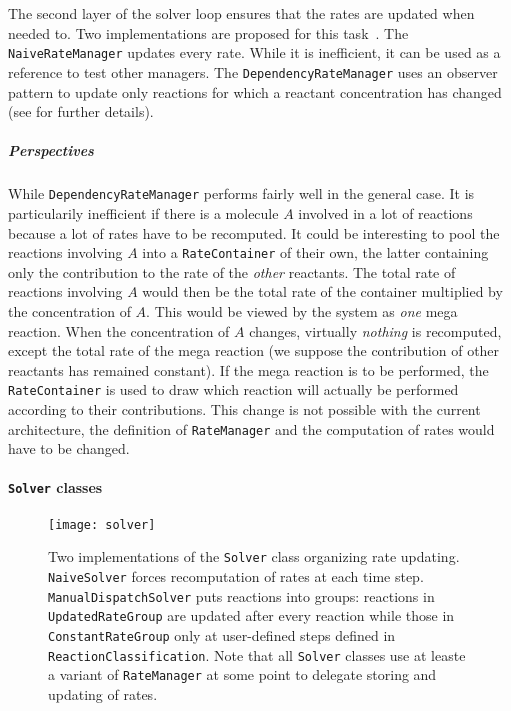 The second layer of the solver loop ensures that the rates are updated when needed to. Two implementations are proposed for this task~. The \texttt{NaiveRateManager} updates every rate. While it is inefficient, it can be used as a reference to test other managers. The \texttt{DependencyRateManager} uses an observer pattern to update only reactions for which a reactant concentration has changed (see \citet{cati} for further details).

\subparagraph{Perspectives} While \texttt{DependencyRateManager} performs fairly well in the general case. It is particularily inefficient if there is a molecule $A$ involved in a lot of reactions because a lot of rates have to be recomputed. It could be interesting to pool the reactions involving $A$ into a \texttt{RateContainer} of their own, the latter containing only the contribution to the rate of the \emph{other} reactants. The total rate of reactions involving $A$ would then be the total rate of the container multiplied by the concentration of $A$. This would be viewed by the system as \emph{one} mega reaction. When the concentration of $A$ changes, virtually \emph{nothing} is recomputed, except the total rate of the mega reaction (we suppose the contribution of other reactants has remained constant). If the mega reaction is to be performed, the \texttt{RateContainer} is used to draw which reaction will actually be performed according to their contributions. This change is not possible with the current architecture, the definition of \texttt{RateManager} and the computation of rates would have to be changed.

\paragraph{\texttt{Solver} classes}

\begin{figure}[!h]
  \centering
  \texttt{[image: solver]}
  \caption{Two implementations of the \texttt{Solver} class organizing rate updating. \texttt{NaiveSolver} forces recomputation of rates at each time step. \texttt{ManualDispatchSolver} puts reactions into groups: reactions in \texttt{UpdatedRateGroup} are updated after every reaction while those in \texttt{ConstantRateGroup} only at user-defined steps defined in \texttt{ReactionClassification}. Note that all \texttt{Solver} classes use at leaste a variant of \texttt{RateManager} at some point to delegate storing and updating of rates.}
  \label{fig:solver_details}
\end{figure}

